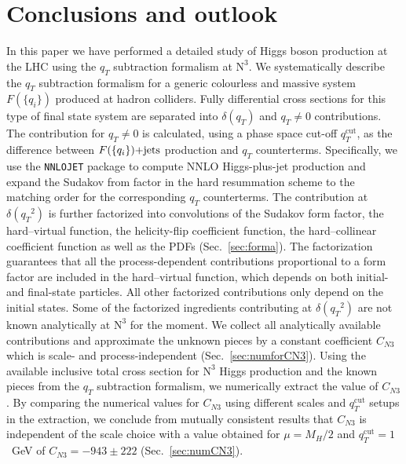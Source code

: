\documentclass[12pt]{article}
\DeclareRobustCommand{\qt}{\ensuremath{q_T}\xspace}
\DeclareRobustCommand{\qtcut}{\ensuremath{q_T^\mathrm{cut}}\xspace}
\DeclareRobustCommand{\LO}{\text{LO}\xspace}
\DeclareRobustCommand{\N}[1]{\ensuremath{\text{N}^{#1}}} %
\begin{document}
\section{Conclusions and outlook}
\label{Sec:conclu}
In this paper we have performed a detailed study of Higgs boson production at the LHC using the $\qt$ subtraction formalism at \N3\LO. We systematically describe the $\qt$ subtraction formalism for a generic colourless and massive system $F(\{q_i\})$ produced at hadron colliders. Fully differential cross sections for this type of final state system are separated into $\delta(\qt)$ and $\qt\ne 0$ contributions. The contribution for $\qt\ne 0$ is calculated, 
using a phase space cut-off $\qtcut$, as the difference between $F(\{q_i\})\rm{+jets}$ production and $\qt$ counterterms. Specifically, we use the \texttt{NNLOJET} package to compute NNLO Higgs-plus-jet production and expand the Sudakov from factor in the hard resummation scheme to the matching order for the corresponding $\qt$ counterterms. The contribution at $\delta(\qt^{2})$ is further factorized into convolutions of the Sudakov form factor, the hard--virtual function, the helicity-flip coefficient function, the hard--collinear coefficient function as well as the PDFs (Sec.~\ref{sec:forma}). The factorization guarantees that all the process-dependent contributions proportional to a form factor are included in the hard--virtual function, which depends on both initial- and final-state particles. All other factorized contributions only depend on the initial states. Some of the factorized ingredients contributing at $\delta(\qt^{2})$ are not known analytically at \N3\LO for the moment. We collect all analytically available contributions and approximate the unknown pieces by a constant coefficient $C_{N3}$ which is scale- and process-independent (Sec.~\ref{sec:numforCN3}). Using the available inclusive total cross section for \N3\LO Higgs production and the known pieces from  the $\qt$ subtraction formalism, we numerically extract the value of $C_{N3}$. By comparing the numerical values for $C_{N3}$ using different scales and $\qtcut$ setups in the extraction, we conclude from mutually consistent results that $C_{N3}$ is independent of the scale choice with a value obtained for $\mu=M_H/2$ and $\qtcut = 1$~GeV of $C_{N3}=-943\pm 222$ (Sec.~\ref{sec:numCN3}).
\end{document}
